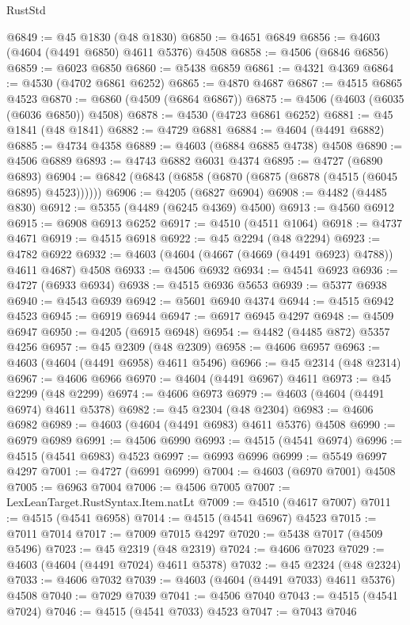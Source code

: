\begin{lexlean}{RustStd}
\begin{coremodule}
@6849 := @45 @1830 (@48 @1830)
@6850 := @4651 @6849
@6856 := @4603 (@4604 (@4491 @6850) @4611 @5376) @4508
@6858 := @4506 (@6846 @6856)
@6859 := @6023 @6850
@6860 := @5438 @6859
@6861 := @4321 @4369
@6864 := @4530 (@4702 @6861 @6252)
@6865 := @4870 @4687
@6867 := @4515 @6865 @4523
@6870 := @6860 (@4509 (@6864 @6867))
@6875 := @4506 (@4603 (@6035 (@6036 @6850)) @4508)
@6878 := @4530 (@4723 @6861 @6252)
@6881 := @45 @1841 (@48 @1841)
@6882 := @4729 @6881
@6884 := @4604 (@4491 @6882)
@6885 := @4734 @4358
@6889 := @4603 (@6884 @6885 @4738) @4508
@6890 := @4506 @6889
@6893 := @4743 @6882 @6031 @4374
@6895 := @4727 (@6890 @6893)
@6904 := @6842 (@6843 (@6858 (@6870 (@6875 (@6878 (@4515 (@6045 @6895) @4523))))))
@6906 := @4205 (@6827 @6904)
@6908 := @4482 (@4485 @830)
@6912 := @5355 (@4489 (@6245 @4369) @4500)
@6913 := @4560 @6912
@6915 := @6908 @6913 @6252
@6917 := @4510 (@4511 @1064)
@6918 := @4737 @4671
@6919 := @4515 @6918
@6922 := @45 @2294 (@48 @2294)
@6923 := @4782 @6922
@6932 := @4603 (@4604 (@4667 (@4669 (@4491 @6923) @4788)) @4611 @4687) @4508
@6933 := @4506 @6932
@6934 := @4541 @6923
@6936 := @4727 (@6933 @6934)
@6938 := @4515 @6936 @5653
@6939 := @5377 @6938
@6940 := @4543 @6939
@6942 := @5601 @6940 @4374
@6944 := @4515 @6942 @4523
@6945 := @6919 @6944
@6947 := @6917 @6945 @4297
@6948 := @4509 @6947
@6950 := @4205 (@6915 @6948)
@6954 := @4482 (@4485 @872) @5357 @4256
@6957 := @45 @2309 (@48 @2309)
@6958 := @4606 @6957
@6963 := @4603 (@4604 (@4491 @6958) @4611 @5496)
@6966 := @45 @2314 (@48 @2314)
@6967 := @4606 @6966
@6970 := @4604 (@4491 @6967) @4611
@6973 := @45 @2299 (@48 @2299)
@6974 := @4606 @6973
@6979 := @4603 (@4604 (@4491 @6974) @4611 @5378)
@6982 := @45 @2304 (@48 @2304)
@6983 := @4606 @6982
@6989 := @4603 (@4604 (@4491 @6983) @4611 @5376) @4508
@6990 := @6979 @6989
@6991 := @4506 @6990
@6993 := @4515 (@4541 @6974)
@6996 := @4515 (@4541 @6983) @4523
@6997 := @6993 @6996
@6999 := @5549 @6997 @4297
@7001 := @4727 (@6991 @6999)
@7004 := @4603 (@6970 @7001) @4508
@7005 := @6963 @7004
@7006 := @4506 @7005
@7007 := LexLeanTarget.RustSyntax.Item.natLt
@7009 := @4510 (@4617 @7007)
@7011 := @4515 (@4541 @6958)
@7014 := @4515 (@4541 @6967) @4523
@7015 := @7011 @7014
@7017 := @7009 @7015 @4297
@7020 := @5438 @7017 (@4509 @5496)
@7023 := @45 @2319 (@48 @2319)
@7024 := @4606 @7023
@7029 := @4603 (@4604 (@4491 @7024) @4611 @5378)
@7032 := @45 @2324 (@48 @2324)
@7033 := @4606 @7032
@7039 := @4603 (@4604 (@4491 @7033) @4611 @5376) @4508
@7040 := @7029 @7039
@7041 := @4506 @7040
@7043 := @4515 (@4541 @7024)
@7046 := @4515 (@4541 @7033) @4523
@7047 := @7043 @7046

\end{coremodule}
\end{lexlean}
